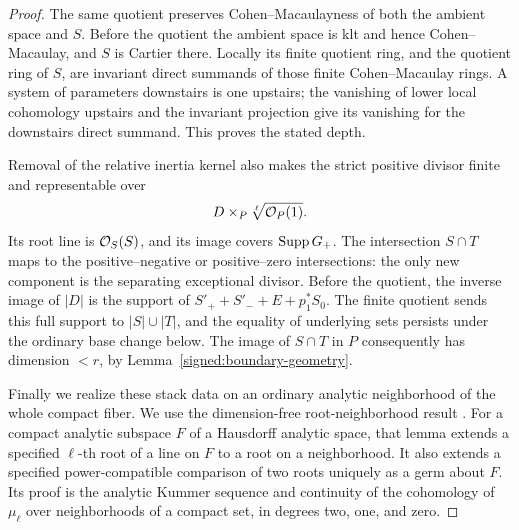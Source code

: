 \begin{proof}
The same quotient preserves Cohen--Macaulayness of both the
ambient space and \(S\).  Before the quotient the ambient
space is klt and hence Cohen--Macaulay, and \(S\) is Cartier
there.  Locally its finite quotient ring, and the quotient
ring of \(S\), are invariant direct summands of those finite
Cohen--Macaulay rings.  A system of parameters downstairs is
one upstairs; the vanishing of lower local cohomology upstairs
and the invariant projection give its vanishing for the
downstairs direct summand.  This proves the stated depth.

Removal of the relative inertia kernel also makes the strict
positive divisor finite and representable over
\[
 D\times_P\sqrt[\ell]{\mathcal O_P(1)}.
\]
Its root line is \(\mathcal O_S(S)\), and its image covers
\(\operatorname{Supp} G_+\).  The intersection \(S\cap T\) maps to the
positive--negative or positive--zero intersections: the only
new component is the separating exceptional divisor.  Before the quotient,
the inverse image of \(|D|\) is the support of
\(S'_++S'_-+E+p_1^*S_0\).  The finite quotient sends this full support
to \(|S|\cup|T|\), and the equality of underlying sets persists under the
ordinary base change below.  The image of \(S\cap T\) in \(P\) consequently
has dimension \(<r\), by Lemma~\ref{signed:boundary-geometry}.

Finally we realize these stack data on an ordinary analytic neighborhood
of the whole compact fiber.  We use the dimension-free root-neighborhood
result \cite[Lemma~10.1]{BL}.
For a compact analytic subspace \(F\) of a Hausdorff analytic
space, that lemma extends a specified \(\ell\)-th root of a
line on \(F\) to a root on a neighborhood.  It also extends
a specified power-compatible comparison of two roots uniquely
as a germ about \(F\).  Its proof is the analytic Kummer
sequence and continuity of the cohomology of \(\mu_\ell\)
over neighborhoods of a compact set, in degrees two, one,
and zero.


\end{proof}

